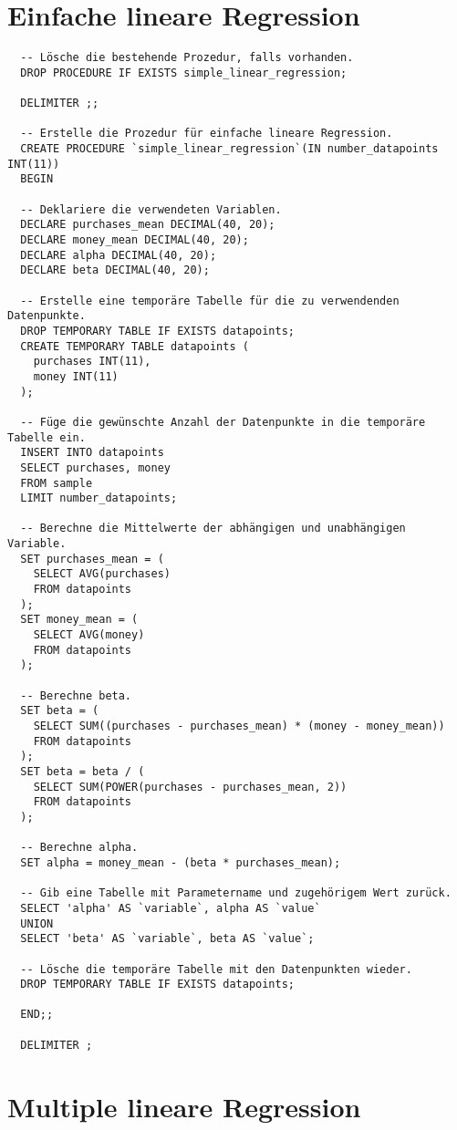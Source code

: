 \section{Einfache lineare Regression}
\label{appendix:D:1}

\begin{verbatim}
  -- Lösche die bestehende Prozedur, falls vorhanden.
  DROP PROCEDURE IF EXISTS simple_linear_regression;

  DELIMITER ;;

  -- Erstelle die Prozedur für einfache lineare Regression.
  CREATE PROCEDURE `simple_linear_regression`(IN number_datapoints INT(11))
  BEGIN

  -- Deklariere die verwendeten Variablen.
  DECLARE purchases_mean DECIMAL(40, 20);
  DECLARE money_mean DECIMAL(40, 20);
  DECLARE alpha DECIMAL(40, 20);
  DECLARE beta DECIMAL(40, 20);

  -- Erstelle eine temporäre Tabelle für die zu verwendenden Datenpunkte.
  DROP TEMPORARY TABLE IF EXISTS datapoints;
  CREATE TEMPORARY TABLE datapoints (
    purchases INT(11),
    money INT(11)
  );

  -- Füge die gewünschte Anzahl der Datenpunkte in die temporäre Tabelle ein.
  INSERT INTO datapoints
  SELECT purchases, money
  FROM sample
  LIMIT number_datapoints;

  -- Berechne die Mittelwerte der abhängigen und unabhängigen Variable.
  SET purchases_mean = (
    SELECT AVG(purchases)
    FROM datapoints
  );
  SET money_mean = (
    SELECT AVG(money)
    FROM datapoints
  );

  -- Berechne beta.
  SET beta = (
    SELECT SUM((purchases - purchases_mean) * (money - money_mean))
    FROM datapoints
  );
  SET beta = beta / (
    SELECT SUM(POWER(purchases - purchases_mean, 2))
    FROM datapoints
  );

  -- Berechne alpha.
  SET alpha = money_mean - (beta * purchases_mean);

  -- Gib eine Tabelle mit Parametername und zugehörigem Wert zurück.
  SELECT 'alpha' AS `variable`, alpha AS `value`
  UNION
  SELECT 'beta' AS `variable`, beta AS `value`;

  -- Lösche die temporäre Tabelle mit den Datenpunkten wieder.
  DROP TEMPORARY TABLE IF EXISTS datapoints;

  END;;

  DELIMITER ;
\end{verbatim}

\section{Multiple lineare Regression}
\label{appendix:D:2}

